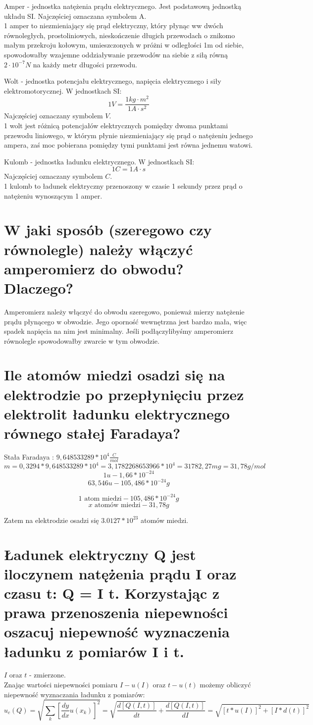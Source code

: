 \documentclass[a4paper,11pt]{article} %
\begin{document}
Amper - jednostka natężenia prądu elektrycznego. Jest podstawową jednostką układu SI. Najczęściej oznaczana symbolem A.\\
1 amper to niezmieniający się prąd elektryczny, który płynąc ww dwóch równoległych, prostoliniowych, nieskończenie długich przewodach o znikomo małym przekroju kołowym, umieszczonych w próżni w odległości 1m od siebie, spowodowałby wzajemne oddziaływanie przewodów na siebie z siłą równą $2\cdot 10^{-7} N$ na każdy metr długości przewodu.

Wolt - jednostka potencjału elektrycznego, napięcia elektrycznego i siły elektromotorycznej. W jednostkach SI: 
$$1V = \frac{1kg\cdot m^2}{1A\cdot s^2}$$
Najczęściej oznaczany symbolem $V$. \\
1 wolt jest różnicą potencjałów elektrycznych pomiędzy dwoma punktami przewodu liniowego, w którym płynie niezmieniający się prąd o natężeniu jednego ampera, zaś moc pobierana pomiędzy tymi punktami jest równa jednemu watowi.

Kulomb - jednostka ładunku elektrycznego. W jednostkach SI:
$$1C = 1A\cdot s$$
Najczęściej oznaczany symbolem $C$.\\
1 kulomb to ładunek elektryczny przenoszony w czasie 1 sekundy przez prąd o natężeniu wynoszącym 1 amper.

\section{W jaki sposób (szeregowo czy równolegle) należy włączyć amperomierz do
obwodu? Dlaczego?}
Amperomierz należy włączyć do obwodu szeregowo, ponieważ mierzy natężenie prądu płynącego w obwodzie. Jego oporność wewnętrzna jest bardzo mała, więc spadek napięcia na nim jest minimalny. Jeśli podłączylibyśmy amperomierz równolegle spowodowałby zwarcie w tym obwodzie.

\section{Ile atomów miedzi osadzi się na elektrodzie po przepłynięciu przez
elektrolit ładunku elektrycznego równego stałej Faradaya?}
Stała Faradaya : $9,648533289 * 10^4 \frac{C}{mol}$
$$m = 0,3294 * 9,648533289 * 10^4 = 3,1782268653966 * 10^4 = 31782,27mg = 31,78g/mol$$
$$1u - 1,66 * 10^{-24}$$
$$63,546 u - 105,486 * 10^{-24} g$$

$$1 \text{ atom miedzi} - 105,486 * 10^{-24} g $$
$$x \text{ atomów miedzi} - 31,78 g $$


Zatem na elektrodzie osadzi się $3.0127 * 10^{23}$ atomów miedzi.
\section{Ładunek elektryczny Q jest iloczynem natężenia prądu I oraz czasu t:
Q = I t. Korzystając z prawa przenoszenia niepewności oszacuj niepewność
wyznaczenia ładunku z pomiarów I i t. }

$I$ oraz $t$ - zmierzone.\\
Znając wartości niepewności pomiaru $I - u(I)$ oraz $t - u(t)$ możemy obliczyć niepewność wyznaczania ładunku z pomiarów:
$$u_c(Q) = \sqrt{\sum_k [\frac{dy}{dx}u(x_k)]^2} = \sqrt{\frac{d[Q(I,t)]}{dt} + \frac{d[Q(I,t)]}{dI}} = \sqrt{[t*u(I)]^2 + [I*d(t)]^2}$$
\end{document}
